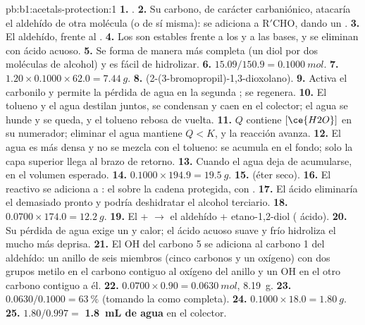 \begin{solution}{pb:b1:acetals-protection:1}
\textbf{1.} .
\textbf{2.} Su carbono, de carácter carbaniónico, atacaría el aldehído de
otra molécula (o de sí misma):  se adiciona a $\mathrm{R'CHO}$,
dando un .
\textbf{3.} El aldehído, frente al .
\textbf{4.} Los  son estables frente a los  y
a las bases, y se eliminan con ácido acuoso.
\textbf{5.} Se forma de manera más completa (un diol por dos moléculas de
alcohol) y es fácil de hidrolizar.
\textbf{6.} $15.09/150.9 = \qty{0.1000}{mol}$.
\textbf{7.} $1.20 \times 0.1000 \times 62.0 = \qty{7.44}{g}$.
\textbf{8.} 
(2-(3-bromopropil)-1,3-dioxolano).
\textbf{9.} Activa el carbonilo y permite la pérdida de agua en la segunda
; se regenera.
\textbf{10.} El tolueno y el agua destilan juntos, se condensan y caen en
el colector; el agua se hunde y se queda, y el tolueno rebosa de vuelta.
\textbf{11.} $Q$ contiene $[\ce{H2O}]$ en su numerador; eliminar el agua
mantiene $Q < K$, y la reacción avanza.
\textbf{12.} El agua es más densa y no se mezcla con el tolueno: se
acumula en el fondo; solo la capa superior llega al brazo de retorno.
\textbf{13.} Cuando el agua deja de acumularse, en el volumen esperado.
\textbf{14.} $0.1000 \times 194.9 = \qty{19.5}{g}$.
\textbf{15.}  (éter seco).
\textbf{16.} El reactivo se adiciona a : el 
 sobre la cadena protegida, con .
\textbf{17.} El ácido eliminaría el  demasiado pronto y
podría deshidratar el alcohol terciario.
\textbf{18.} $0.0700 \times 174.0 = \qty{12.2}{g}$.
\textbf{19.} El  +  $\to$ el aldehído + etano-1,2-diol
( ácido).
\textbf{20.} Su pérdida de agua exige un  y calor; el ácido
acuoso suave y frío hidroliza el  mucho más deprisa.
\textbf{21.} El OH del carbono 5 se adiciona al carbono 1 del aldehído: un
anillo de seis miembros (cinco carbonos y un oxígeno) con dos grupos
metilo en el carbono contiguo al oxígeno del anillo y un OH en el otro
carbono contiguo a él.
\textbf{22.} $0.0700 \times 0.90 = \qty{0.0630}{mol}$, \qty{8.19}{g}.
\textbf{23.} $0.0630/0.1000 = \qty{63}{\percent}$ (tomando la 
como completa).
\textbf{24.} $0.1000 \times 18.0 = \qty{1.80}{g}$.
\textbf{25.} $1.80/0.997 =$ \textbf{\qty{1.8}{mL} de agua} en el colector.
\end{solution}
